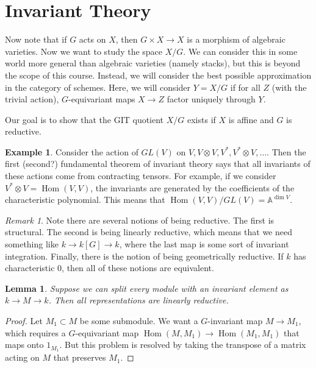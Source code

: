 \documentclass[leqno, openany]{memoir}
\newtheorem{lem}[thm]{Lemma}
\theoremstyle{definition}
\newtheorem{exm}[thm]{Example}
\theoremstyle{remark}
\newtheorem{rmk}[thm]{Remark}
\theoremstyle{plain}
\theoremstyle{definition}
\theoremstyle{remark}
\newcommand{\A}{\mathbb{A}}
\DeclareMathOperator{\Hom}{Hom}
\begin{document}
\section{Invariant Theory}%

Now note that if $G$ acts on $X$, then $G \times X \to X$ is a morphism of
algebraic varieties. Now we want to study the space $X/G$. We can consider this
in some world more general than algebraic varieties (namely stacks), but this
is beyond the scope of this course. Instead, we will consider the best possible
approximation in the category of schemes. Here, we will consider $Y = X / G$ if
for all $Z$ (with the trivial action), $G$-equivariant maps $X \to Z$ factor
uniquely through $Y$.

Our goal is to show that the GIT quotient $X/G$ exists if $X$ is affine and $G$
is reductive.

\begin{exm} Consider the action of $GL(V)$ on $V, V \otimes V, V^*, V^* \otimes
    V, \ldots$. Then the first (second?) fundamental theorem of invariant
    theory says that all invariants of these actions come from contracting
    tensors. For example, if we consider $V^* \otimes V = \Hom(V,V)$, the
    invariants are generated by the coefficients of the characteristic
    polynomial. This means that $\Hom(V,V) / GL(V) = \A^{\dim V}$.  \end{exm}

\begin{rmk} Note there are several notions of being reductive. The first is
    structural. The second is being linearly reductive, which means that we
    need something like $k \to k[G] \to k$, where the last map is some sort of
    invariant integration. Finally, there is the notion of being geometrically
    reductive. If $k$ has characteristic $0$, then all of these notions are
    equivalent.  \end{rmk}

\begin{lem} Suppose we can split every module with an invariant element as $k
\to M \to k$. Then all representations are linearly reductive.  \end{lem}

\begin{proof} Let $M_1 \subset M$ be some submodule. We want a $G$-invariant
    map $M \to M_1$, which requires a $G$-equivariant map $\Hom(M, M_1) \to
    \Hom(M_1, M_1)$ that maps onto $1_{M_1}$. But this problem is resolved by
    taking the transpose of a matrix acting on $M$ that preserves $M_1$.
\end{proof}
\end{document}
